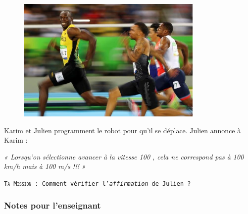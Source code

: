 \begin{figure}
    \includegraphics[width=\linewidth]{res/mbot-vitesse-sprint.png}
\end{figure}

\begin{eleve}    

Karim et Julien programment le robot \mbot pour qu’il se déplace. Julien annonce à Karim :

\vspace{1em}

\begin{minipage}{0.65\linewidth}
    \emph{« Lorsqu’on sélectionne avancer à la vitesse 100 , cela ne correspond pas à 100 km/h mais à 100 m/s !!! »}
\end{minipage}

\vspace{1em}

\texttt{\Large\textsc{Ta Mission} : Comment vérifier l’\emph{affirmation} de Julien ?}
    
\end{eleve}



\subsubsection{Notes pour l'enseignant}

%
%



